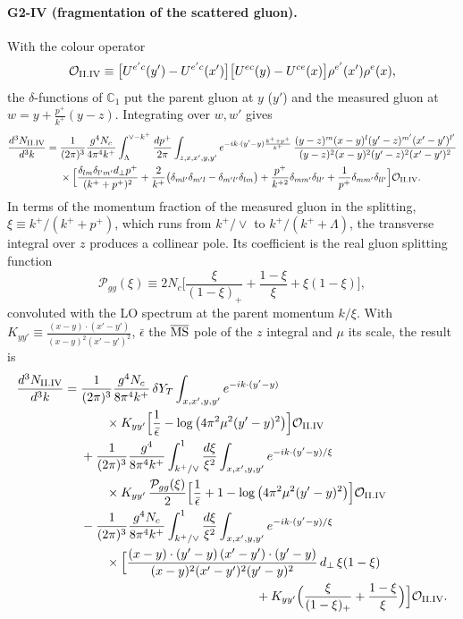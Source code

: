 \documentclass[aps,prd,onecolumn,superscriptaddress,nofootinbib,floatfix,longbibliography,11pt]{revtex4-2}
\numberwithin{equation}{section}
\def\mf#1{\mathbb{#1}}
\newcommand{\Ord}{\mathcal{O}}
\newcommand{\MSbar}{\overline{\rm MS}}
\begin{document}
\paragraph*{G2-IV (fragmentation of the scattered gluon).} With the colour operator
\begin{equation}
\Ord_{\rm II.IV}\equiv\big[U^{e'c}(y')-U^{e'c}(x')\big]\big[U^{ec}(y)-U^{ce}(x)\big]\rho^{e'}(x')\rho^e(x),
\end{equation}
the $\delta$-functions of $\mf C_1$ put the parent gluon at $y$ ($y'$) and the measured gluon at $w=y+\frac{p^+}{k^+}(y-z)$. Integrating over $w,w'$ gives
\begin{align}
\frac{d^3N_{\rm II.IV}}{d^3k}={}&\frac{1}{(2\pi)^3}\frac{g^4N_c}{4\pi^4k^+}\int_{\Lambda}^{\vee-k^+}\frac{dp^+}{2\pi}\int_{z,x,x',y,y'}e^{-ik\cdot(y'-y)\frac{k^++p^+}{k^+}}\,\frac{(y-z)^m(x-y)^l(y'-z)^{m'}(x'-y')^{l'}}{(y-z)^2(x-y)^2(y'-z)^2(x'-y')^2}\notag\\
&\times\Big[\frac{\delta_{lm}\delta_{l'm'}d_\perp p^+}{(k^++p^+)^2}+\frac{2}{k^+}\big(\delta_{ml'}\delta_{m'l}-\delta_{m'l'}\delta_{lm}\big)+\frac{p^+}{k^{+2}}\delta_{mm'}\delta_{ll'}+\frac{1}{p^+}\delta_{mm'}\delta_{ll'}\Big]\Ord_{\rm II.IV}.
\label{eq:GIIIV}
\end{align}
In terms of the momentum fraction of the measured gluon in the splitting, $\xi\equiv k^+/(k^++p^+)$, which runs from $k^+/\vee$ to $k^+/(k^++\Lambda)$, the transverse integral over $z$ produces a collinear pole. Its coefficient is the real gluon splitting function
\begin{equation}
\mathcal P_{gg}(\xi)\equiv2N_c\Big[\frac{\xi}{(1-\xi)_+}+\frac{1-\xi}{\xi}+\xi(1-\xi)\Big],
\label{eq:Pgg}
\end{equation}
convoluted with the LO spectrum at the parent momentum $k/\xi$. With $K_{yy'}\equiv\frac{(x-y)\cdot(x'-y')}{(x-y)^2(x'-y')^2}$, $\bar\epsilon$ the $\MSbar$ pole of the $z$ integral and $\mu$ its scale, the result is
\begin{align}
\frac{d^3N_{\rm II.IV}}{d^3k}={}&\frac{1}{(2\pi)^3}\frac{g^4N_c}{8\pi^4k^+}\,\delta Y_T\int_{x,x',y,y'}e^{-ik\cdot(y'-y)}\notag\\
&\qquad\times K_{yy'}\Big[\frac{1}{\bar\epsilon}-\log\big(4\pi^2\mu^2(y'-y)^2\big)\Big]\Ord_{\rm II.IV}\notag\\
&+\frac{1}{(2\pi)^3}\frac{g^4}{8\pi^4k^+}\int_{k^+/\vee}^{1}\frac{d\xi}{\xi^2}\int_{x,x',y,y'}e^{-ik\cdot(y'-y)/\xi}\notag\\
&\qquad\times K_{yy'}\,\frac{\mathcal P_{gg}(\xi)}{2}\Big[\frac{1}{\bar\epsilon}+1-\log\big(4\pi^2\mu^2(y'-y)^2\big)\Big]\Ord_{\rm II.IV}\notag\\
&-\frac{1}{(2\pi)^3}\frac{g^4N_c}{8\pi^4k^+}\int_{k^+/\vee}^{1}\frac{d\xi}{\xi^2}\int_{x,x',y,y'}e^{-ik\cdot(y'-y)/\xi}\notag\\
&\qquad\times\Big[\frac{(x-y)\cdot(y'-y)\,(x'-y')\cdot(y'-y)}{(x-y)^2(x'-y')^2(y'-y)^2}\,d_\perp\,\xi(1-\xi)\notag\\
&\hspace{14em}+K_{yy'}\Big(\frac{\xi}{(1-\xi)_+}+\frac{1-\xi}{\xi}\Big)\Big]\Ord_{\rm II.IV}.
\label{eq:GIIIVres}
\end{align}
\end{document}
